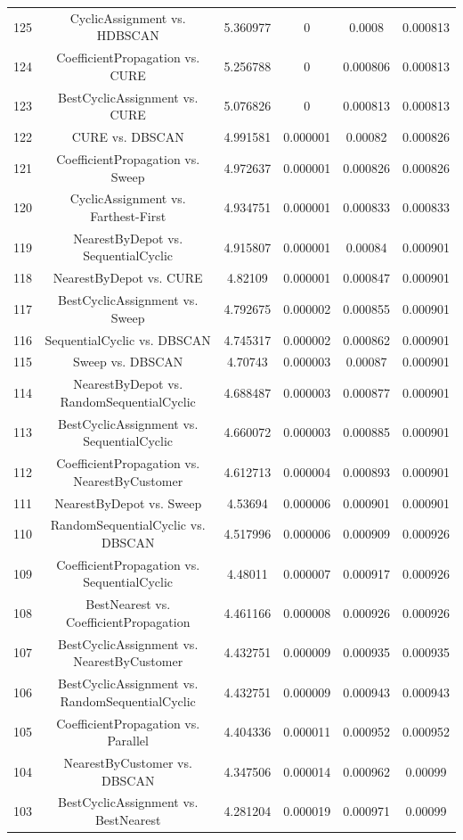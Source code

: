 \documentclass[a4paper,10pt]{article}
\begin{document}
\begin{landscape}
\begin{table}[!htp]
\begin{tabular}{cccccc}
125&CyclicAssignment vs. HDBSCAN&5.360977&0&0.0008&0.000813\\
124&CoefficientPropagation vs. CURE&5.256788&0&0.000806&0.000813\\
123&BestCyclicAssignment vs. CURE&5.076826&0&0.000813&0.000813\\
122&CURE vs. DBSCAN&4.991581&0.000001&0.00082&0.000826\\
121&CoefficientPropagation vs. Sweep&4.972637&0.000001&0.000826&0.000826\\
120&CyclicAssignment vs. Farthest-First&4.934751&0.000001&0.000833&0.000833\\
119&NearestByDepot vs. SequentialCyclic&4.915807&0.000001&0.00084&0.000901\\
118&NearestByDepot vs. CURE&4.82109&0.000001&0.000847&0.000901\\
117&BestCyclicAssignment vs. Sweep&4.792675&0.000002&0.000855&0.000901\\
116&SequentialCyclic vs. DBSCAN&4.745317&0.000002&0.000862&0.000901\\
115&Sweep vs. DBSCAN&4.70743&0.000003&0.00087&0.000901\\
114&NearestByDepot vs. RandomSequentialCyclic&4.688487&0.000003&0.000877&0.000901\\
113&BestCyclicAssignment vs. SequentialCyclic&4.660072&0.000003&0.000885&0.000901\\
112&CoefficientPropagation vs. NearestByCustomer&4.612713&0.000004&0.000893&0.000901\\
111&NearestByDepot vs. Sweep&4.53694&0.000006&0.000901&0.000901\\
110&RandomSequentialCyclic vs. DBSCAN&4.517996&0.000006&0.000909&0.000926\\
109&CoefficientPropagation vs. SequentialCyclic&4.48011&0.000007&0.000917&0.000926\\
108&BestNearest vs. CoefficientPropagation&4.461166&0.000008&0.000926&0.000926\\
107&BestCyclicAssignment vs. NearestByCustomer&4.432751&0.000009&0.000935&0.000935\\
106&BestCyclicAssignment vs. RandomSequentialCyclic&4.432751&0.000009&0.000943&0.000943\\
105&CoefficientPropagation vs. Parallel&4.404336&0.000011&0.000952&0.000952\\
104&NearestByCustomer vs. DBSCAN&4.347506&0.000014&0.000962&0.00099\\
103&BestCyclicAssignment vs. BestNearest&4.281204&0.000019&0.000971&0.00099\\

\end{tabular}
\end{table}
\end{landscape}
\end{document}
